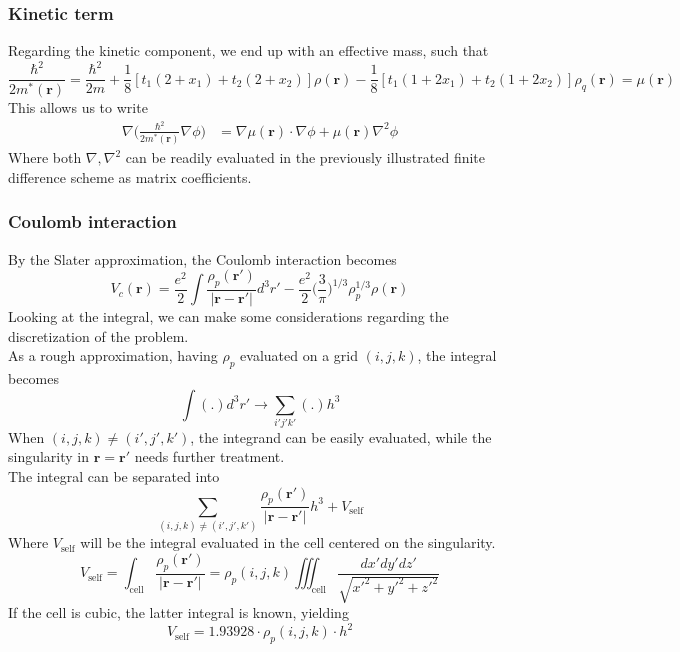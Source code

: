 \subsubsection{Kinetic term}
Regarding the kinetic component, we end up with an effective mass, such that 
\[\frac{\hbar^2}{2m^*(\mathbf r)} = \frac{\hbar^2}{2m} + \frac 1 8 [t_1(2+x_1)+t_2(2+x_2)]\rho(\mathbf r) - \frac 1 8 [t_1(1+2x_1)+t_2(1+2x_2)]\rho_q(\mathbf r ) = \mu(\mathbf r)\]
This allows us to write
\begin{align}
    \nabla\bigg( \frac{\hbar^2}{2m^*(\mathbf r)} \nabla \phi\bigg)&= \nabla \mu(\mathbf r)\cdot \nabla \phi +\mu(\mathbf r)\nabla^2 \phi 
\end{align}
Where both $\nabla, \nabla^2$ can be readily evaluated in the previously illustrated finite difference scheme as matrix coefficients.
\subsubsection{Coulomb interaction}
By the Slater approximation, the Coulomb interaction becomes
\begin{equation}
    V_c(\mathbf r) = \frac{e^2}{2}\int \frac{\rho_p(\mathbf r')}{|\mathbf r-\mathbf r'|} d^3 r' - \frac{e^2}{2}\bigg(\frac {3}{\pi}\bigg)^{1/3}\rho_p^{1/3}\rho(\mathbf r)
\end{equation}
Looking at the integral, we can make some considerations regarding the discretization of the problem.
\\As a rough approximation, having $\rho_p$ evaluated on a grid $(i, j, k)$, the integral becomes
\[\int (.)d^3 r' \to \sum_{i'j'k'} (.) h^3\]
When $(i, j, k)\neq (i', j', k')$, the integrand can be easily evaluated, while the singularity in $\mathbf r = \mathbf r'$ needs further treatment.
\\The integral can be separated into 
\[\sum_{(i, j, k)\neq (i', j', k')} \frac{\rho_p(\mathbf r')}{|\mathbf r-\mathbf r'|} h^3 + V_\text{self} \]
Where $V_\text{self}$ will be the integral evaluated in the cell centered on the singularity.
\[V_\text{self} = \int_{\text{cell}}\frac{\rho_p(\mathbf r')}{|\mathbf r-\mathbf r'|} = \rho_p(i, j, k)\iiint_{\text{cell}}\frac{dx'dy'dz'}{\sqrt{x'^2+y'^2+z'^2}}\]
If the cell is cubic, the latter integral is known, yielding
\[V_\text{self} = 1.93928\cdot\rho_p(i, j, k)\cdot h^2\]


